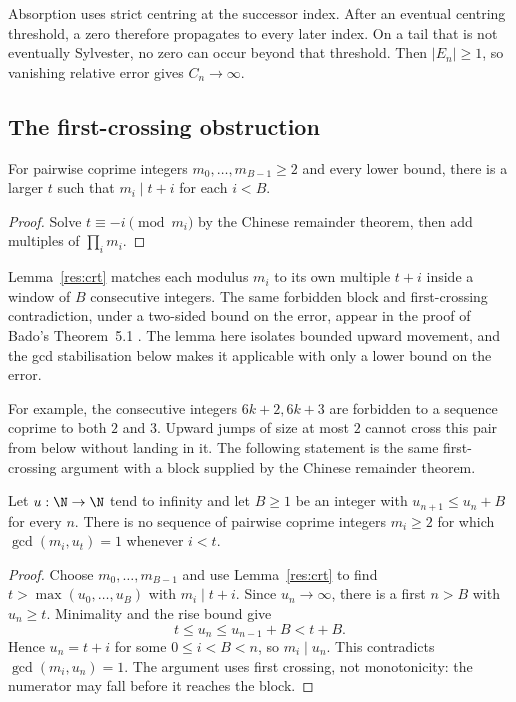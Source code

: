 \documentclass[11pt]{article}
\begin{document}
Absorption uses strict centring at the successor index. After an
eventual centring threshold, a zero therefore propagates to every later
index. On a tail that is not eventually Sylvester, no zero can occur
beyond that threshold. Then $|E_n|\ge1$, so vanishing relative error gives
$C_n\to\infty$.

\subsection{The first-crossing obstruction}\label{sec:barrier}
\begin{lemma}\label{res:crt}
For pairwise coprime integers $m_0,\ldots,m_{B-1}\ge2$ and every lower
bound, there is a larger $t$ such that $m_i\mid t+i$ for each $i<B$.
\end{lemma}
\begin{proof}
Solve $t\equiv-i\pmod{m_i}$ by the Chinese remainder theorem, then add
multiples of $\prod_i m_i$.
\end{proof}

\noindent Lemma~\ref{res:crt} matches each modulus $m_i$ to its own multiple
$t+i$ inside a window of $B$ consecutive integers. The same forbidden block
and first-crossing contradiction, under a two-sided bound on the error, appear
in the proof of Bado's Theorem~5.1 \cite[pp.~4--5]{bado2026}. The lemma here
isolates bounded upward movement, and the gcd stabilisation below makes it
applicable with only a lower bound on the error.

For example, the consecutive integers $6k+2,6k+3$ are forbidden to a
sequence coprime to both $2$ and $3$. Upward jumps of size at most $2$
cannot cross this pair from below without landing in it. The following
statement is the same first-crossing argument with a block supplied by
the Chinese remainder theorem.

\begin{theorem}\label{res:barrier}
Let $u:\N\to\N$ tend to infinity and let $B\ge1$ be an integer with
$u_{n+1}\le u_n+B$ for every $n$. There is no sequence of pairwise coprime
integers $m_i\ge2$ for which $\gcd(m_i,u_t)=1$ whenever $i<t$.
\end{theorem}
\begin{proof}
Choose $m_0,\ldots,m_{B-1}$ and use Lemma~\ref{res:crt} to find
$t>\max(u_0,\ldots,u_B)$ with $m_i\mid t+i$.  Since $u_n\to\infty$,
there is a first $n>B$ with $u_n\ge t$.  Minimality and the rise bound give
\[
 t\le u_n\le u_{n-1}+B<t+B.
\]
Hence $u_n=t+i$ for some $0\le i<B<n$, so $m_i\mid u_n$.
This contradicts $\gcd(m_i,u_n)=1$.  The argument uses first crossing,
not monotonicity: the numerator may fall before it reaches the block.
\end{proof}
\end{document}
